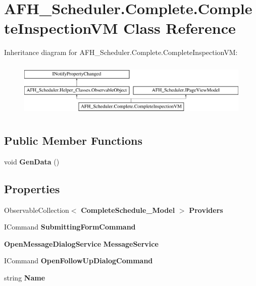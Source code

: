 \section{A\+F\+H\+\_\+\+Scheduler.\+Complete.\+Complete\+Inspection\+VM Class Reference}
\label{class_a_f_h___scheduler_1_1_complete_1_1_complete_inspection_v_m}
Inheritance diagram for A\+F\+H\+\_\+\+Scheduler.\+Complete.\+Complete\+Inspection\+VM\+:\begin{figure}[H]
\begin{center}
\leavevmode
\includegraphics[height=2.700965cm]{class_a_f_h___scheduler_1_1_complete_1_1_complete_inspection_v_m}
\end{center}
\end{figure}
\subsection*{Public Member Functions}
\begin{DoxyCompactItemize}
\item 
void \textbf{ Gen\+Data} ()
\end{DoxyCompactItemize}
\subsection*{Properties}
\begin{DoxyCompactItemize}
\item 
\mbox{\label{class_a_f_h___scheduler_1_1_complete_1_1_complete_inspection_v_m_a2fafffeca4f6f566fb1d7c61f452b7f1}} 
Observable\+Collection$<$ \textbf{ Complete\+Schedule\+\_\+\+Model} $>$ {\bfseries Providers}\hspace{0.3cm}{\ttfamily  [get, set]}
\item 
\mbox{\label{class_a_f_h___scheduler_1_1_complete_1_1_complete_inspection_v_m_ae743f398581fd3ca0da85b6000de0e54}} 
I\+Command {\bfseries Submitting\+Form\+Command}\hspace{0.3cm}{\ttfamily  [get]}
\item 
\mbox{\label{class_a_f_h___scheduler_1_1_complete_1_1_complete_inspection_v_m_af2df0b1c1297a29b0c0dc6c3ed8e194b}} 
\textbf{ Open\+Message\+Dialog\+Service} {\bfseries Message\+Service}\hspace{0.3cm}{\ttfamily  [get]}
\item 
\mbox{\label{class_a_f_h___scheduler_1_1_complete_1_1_complete_inspection_v_m_a3d7a97178524e0fc2351b3d39b7838de}} 
I\+Command {\bfseries Open\+Follow\+Up\+Dialog\+Command}\hspace{0.3cm}{\ttfamily  [get]}
\item 
\mbox{\label{class_a_f_h___scheduler_1_1_complete_1_1_complete_inspection_v_m_a8303320722f5c426187c072b210d22f7}} 
string {\bfseries Name}\hspace{0.3cm}{\ttfamily  [get]}
\end{DoxyCompactItemize}
